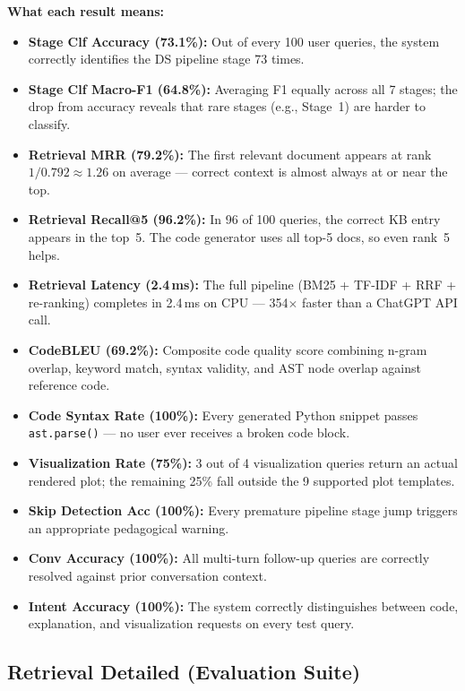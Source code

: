 \documentclass[12pt,a4paper]{article}
\begin{document}
\textbf{What each result means:}
\begin{itemize}[leftmargin=*]
  \item \textbf{Stage Clf Accuracy (73.1\%):} Out of every 100 user queries, the system correctly identifies the DS pipeline stage 73 times.
  \item \textbf{Stage Clf Macro-F1 (64.8\%):} Averaging F1 equally across all 7 stages; the drop from accuracy reveals that rare stages (e.g., Stage~1) are harder to classify.
  \item \textbf{Retrieval MRR (79.2\%):} The first relevant document appears at rank $1/0.792\approx1.26$ on average --- correct context is almost always at or near the top.
  \item \textbf{Retrieval Recall@5 (96.2\%):} In 96 of 100 queries, the correct KB entry appears in the top~5. The code generator uses all top-5 docs, so even rank~5 helps.
  \item \textbf{Retrieval Latency (2.4\,ms):} The full pipeline (BM25 + TF-IDF + RRF + re-ranking) completes in 2.4\,ms on CPU --- 354$\times$ faster than a ChatGPT API call.
  \item \textbf{CodeBLEU (69.2\%):} Composite code quality score combining n-gram overlap, keyword match, syntax validity, and AST node overlap against reference code.
  \item \textbf{Code Syntax Rate (100\%):} Every generated Python snippet passes \texttt{ast.parse()} --- no user ever receives a broken code block.
  \item \textbf{Visualization Rate (75\%):} 3 out of 4 visualization queries return an actual rendered plot; the remaining 25\% fall outside the 9 supported plot templates.
  \item \textbf{Skip Detection Acc (100\%):} Every premature pipeline stage jump triggers an appropriate pedagogical warning.
  \item \textbf{Conv Accuracy (100\%):} All multi-turn follow-up queries are correctly resolved against prior conversation context.
  \item \textbf{Intent Accuracy (100\%):} The system correctly distinguishes between code, explanation, and visualization requests on every test query.
\end{itemize}

\subsection{Retrieval Detailed (Evaluation Suite)}
\end{document}
